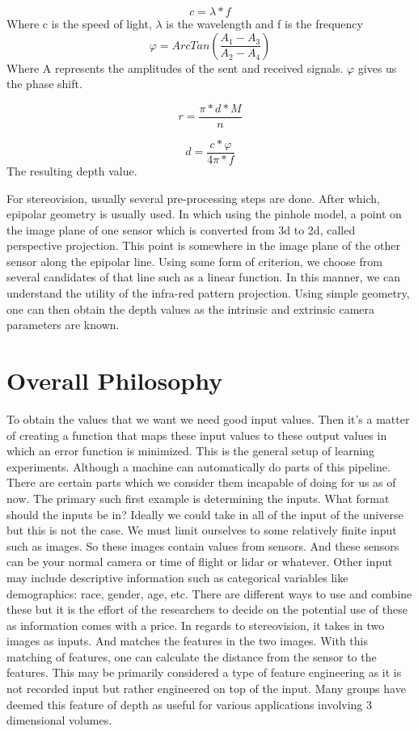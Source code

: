 \begin{equation}
c = \lambda * f
\end{equation}
Where c is the speed of light, $\lambda$ is the wavelength and f is the frequency
\begin{equation}
	\varphi = ArcTan(\frac{A_1 - A_3}{A_2 - A_4})
\end{equation}
Where A represents the amplitudes of the sent and received signals. $\varphi$ gives us the phase shift.

\begin{equation}
	r = \frac{\pi * d * M}{n}
\end{equation}

\begin{equation}
	d = \frac{c * \varphi}{4\pi * f}
\end{equation}
The resulting depth value.

For stereovision, usually several pre-processing steps are done. After which, epipolar geometry is usually used. In which using the pinhole model, a point on the image plane of one sensor which is converted from 3d to 2d, called perspective projection. This point is somewhere in the image plane of the other sensor along the epipolar line. Using some form of criterion, we choose from several candidates of that line such as a linear function. In this manner, we can understand the utility of the infra-red pattern projection. Using simple geometry, one can then obtain the depth values as the intrinsic and extrinsic camera parameters are known.
\section{Overall Philosophy}
To obtain the values that we want we need good input values. Then it's a matter of creating a function that maps these input values to these output values in which an error function is minimized. 
This is the general setup of learning experiments. Although a machine can automatically do parts of this pipeline. There are certain parts which we consider them incapable of doing for us as of now. The primary such first example is determining the inputs. What format should the inputs be in? Ideally we could take in all of the input of the universe but this is not the case. We must limit ourselves to some relatively finite input such as images. So these images contain values from sensors. And these sensors can be your normal camera or time of flight or lidar or whatever. Other input may include descriptive information such as categorical variables like demographics: race, gender, age, etc. There are different ways to use and combine these but it is the effort of the researchers to decide on the potential use of these as information comes with a price. In regards to stereovision, it takes in two images as inputs. And matches the features in the two images. With this matching of features, one can calculate the distance from the sensor to the features. This may be primarily considered a type of feature engineering as it is not recorded input but rather engineered on top of the input. Many groups have deemed this feature of depth as useful for various applications involving 3 dimensional volumes.

